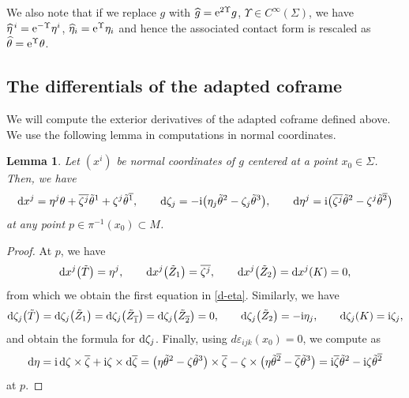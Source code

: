 \documentclass[11pt]{article}
\numberwithin{equation}{section}
\newcommand\e{\varepsilon}
\renewcommand\th{\theta}
\newcommand\ol{\overline}
\newcommand{\wh}{\widehat}
\numberwithin{equation}{section}
\newtheorem{Lemma}[Theorem]{Lemma}
\begin{document}
We also note that if we replace $g$ with $\wh g={\rm e}^{2\Upsilon} g$, $\Upsilon\in C^\infty(\Sigma)$, we have $\wh\eta^{\,i}={\rm e}^{-\Upsilon}\eta^i$, $\wh\eta_i={\rm e}^{\Upsilon}\eta_i$ and hence the associated contact form is rescaled as $\wh\th={\rm e}^{\Upsilon}\th$.


\subsection{The differentials of the adapted coframe}
We will compute the exterior derivatives of the adapted coframe defined above.
We use the following lemma in computations in normal coordinates.
\begin{Lemma}
Let $(x^i)$ be normal coordinates of $g$ centered at a point $x_0\in\Sigma$. Then, we have
\begin{equation}\label{d-eta}
{\rm d}x^j=\eta^j\theta+\ol{\zeta^j}\tilde\theta^1+\zeta^j\tilde\theta^{\ol1}, \qquad
{\rm d}\zeta_j=-{\rm i}\bigl(\eta_j\tilde\theta^2-\zeta_j\tilde\theta^3\bigr), \qquad
{\rm d}\eta^j={\rm i}\bigl(\ol{\zeta^j}\tilde\theta^2-\zeta^j\tilde\theta^{\ol2}\bigr)
\end{equation}
at any point $p\in \pi^{-1}(x_0)\subset M$.
\end{Lemma}
\begin{proof}
At $p$, we have
\[
{\rm d}x^j\bigl(\tilde T\bigr)=\eta^j, \qquad {\rm d}x^j\bigl(\tilde Z_1\bigr)=\ol{\zeta^j},\qquad {\rm d}x^j\bigl(\tilde Z_2\bigr)={\rm d}x^j(K)=0,
\]
from which we obtain the first equation in \eqref{d-eta}. Similarly, we have
\[
{\rm d}\zeta_j\bigl(\tilde T\bigr)={\rm d}\zeta_j\bigl(\tilde Z_{1}\bigr)={\rm d}\zeta_j\bigl(\tilde Z_{\ol1}\bigr)={\rm d}\zeta_j\bigl(\tilde Z_{\ol2}\bigr)=0, \qquad
{\rm d}\zeta_j\bigl(\tilde Z_2\bigr)=-{\rm i}\eta_j, \qquad
{\rm d}\zeta_j(K)={\rm i}\zeta_j,
\]
and obtain the formula for ${\rm d}\zeta_j$. Finally, using $d\e_{ijk}(x_0)=0$, we compute as
 \[
{\rm d}\eta={\rm i}\,{\rm d}\zeta\times \ol\zeta+{\rm i}\zeta\times {\rm d}\ol\zeta
=\bigl(\eta\tilde\theta^2-\zeta\tilde\theta^3\bigr)\times\ol\zeta-\zeta\times\bigl(\eta\tilde\theta^{\ol2}-\ol\zeta\tilde\theta^3\bigr)={\rm i}\ol\zeta\tilde\theta^2-{\rm i}\zeta\tilde\theta^{\ol2}
\]
at $p$.
\end{proof}
\end{document}
